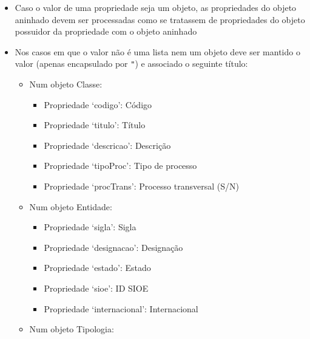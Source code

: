 \begin{itemize}
\begin{itemize}
\begin{itemize}
\begin{itemize}
                      Valor: Concatenação por \verb|#\n| da propriedade `tipoId' de cada elemento da lista
                \item Título: ProcRefs/LegRefs DF \\
                      Valor: Cada elemento da lista é mapeado para a concatenação por \verb|#\n| da lista presente na propriedade `processos' ou na propriedade `legs' sendo a concatenação encapsulada por parênteses curvos; Concatenação por \verb|#\n| do mapeamento de cada elemento da lista               
            \end{itemize}
        \end{itemize}
    \end{itemize}
    \item Caso o valor de uma propriedade seja um objeto, as propriedades do objeto aninhado devem ser processadas como se tratassem de propriedades do objeto possuidor da propriedade com o objeto aninhado
    \item Nos casos em que o valor não é uma lista nem um objeto deve ser mantido o valor (apenas encapsulado por \verb|"|) e associado o seguinte título:
    \begin{itemize}
        \item Num objeto Classe:
        \begin{itemize}
            \item Propriedade `codigo': Código
            \item Propriedade `titulo': Título
            \item Propriedade `descricao': Descrição
            \item Propriedade `tipoProc': Tipo de processo
            \item Propriedade `procTrans': Processo transversal (S/N)
        \end{itemize}
        \item Num objeto Entidade:
        \begin{itemize}
            \item Propriedade `sigla': Sigla
            \item Propriedade `designacao': Designação
            \item Propriedade `estado': Estado
            \item Propriedade `sioe': ID SIOE
            \item Propriedade `internacional': Internacional
        \end{itemize}
        \item Num objeto Tipologia:

\end{itemize}
\end{itemize}
